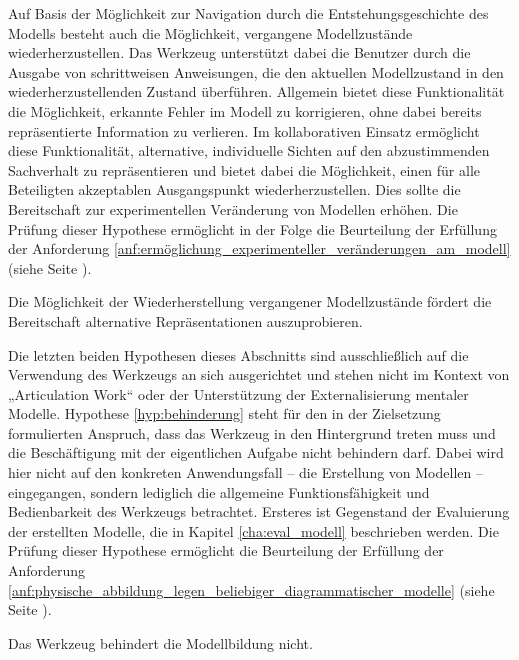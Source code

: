 Auf Basis der Möglichkeit zur Navigation durch die Entstehungsgeschichte des Modells besteht auch die Möglichkeit, vergangene Modellzustände wiederherzustellen. Das Werkzeug unterstützt dabei die Benutzer durch die Ausgabe von schrittweisen Anweisungen, die den aktuellen Modellzustand in den wiederherzustellenden Zustand überführen. Allgemein bietet diese Funktionalität die Möglichkeit, erkannte Fehler im Modell zu korrigieren, ohne dabei bereits repräsentierte Information zu verlieren. Im kollaborativen Einsatz ermöglicht diese Funktionalität, alternative, individuelle Sichten auf den abzustimmenden Sachverhalt zu repräsentieren und bietet dabei die Möglichkeit, einen für alle Beteiligten akzeptablen Ausgangspunkt wiederherzustellen. Dies sollte die Bereitschaft zur experimentellen Veränderung von Modellen erhöhen. Die Prüfung dieser Hypothese ermöglicht in der Folge die Beurteilung der Erfüllung der Anforderung \ref{anf:ermöglichung_experimenteller_veränderungen_am_modell} (siehe Seite \pageref{anf:ermöglichung_experimenteller_veränderungen_am_modell}).

\begin{hyp}
	\label{hyp:wiederherstellung}
	Die Möglichkeit der Wiederherstellung vergangener Modellzustände fördert die Bereitschaft alternative Repräsentationen auszuprobieren.
\end{hyp}

Die letzten beiden Hypothesen dieses Abschnitts sind ausschließlich auf die Verwendung des Werkzeugs an sich ausgerichtet und stehen nicht im Kontext von „Articulation Work“ oder der Unterstützung der Externalisierung mentaler Modelle. Hypothese \ref{hyp:behinderung} steht für den in der Zielsetzung formulierten Anspruch, dass das Werkzeug in den Hintergrund treten muss und die Beschäftigung mit der eigentlichen Aufgabe nicht behindern darf. Dabei wird hier nicht auf den konkreten Anwendungsfall -- die Erstellung von Modellen -- eingegangen, sondern lediglich die allgemeine Funktionsfähigkeit und Bedienbarkeit des Werkzeugs betrachtet. Ersteres ist Gegenstand der Evaluierung der erstellten Modelle, die in Kapitel \ref{cha:eval_modell} beschrieben werden. Die Prüfung dieser Hypothese ermöglicht die Beurteilung der Erfüllung der Anforderung \ref{anf:physische_abbildung_legen_beliebiger_diagrammatischer_modelle} (siehe Seite \pageref{anf:physische_abbildung_legen_beliebiger_diagrammatischer_modelle}).

\begin{hyp}
	\label{hyp:behinderung}
	Das Werkzeug behindert die Modellbildung nicht.
\end{hyp}

